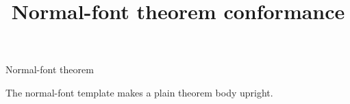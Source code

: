 \documentclass[aspectratio=169]{beamer}
\title{Normal-font theorem conformance}
\date{}
\begin{document}
\begin{frame}{Normal-font theorem}
  \begin{theorem}
    The normal-font template makes a plain theorem body upright.
  \end{theorem}
\end{frame}
\end{document}
